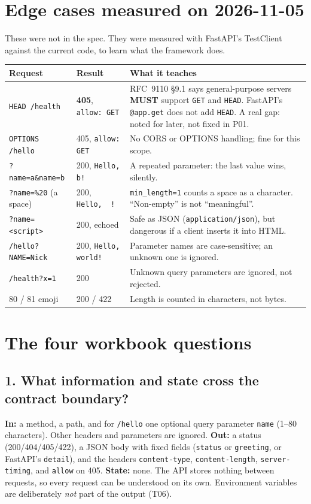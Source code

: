 \documentclass[11pt,a4paper]{article}
\newcommand{\code}[1]{\texttt{#1}}
\begin{document}
\section{Edge cases measured on 2026-11-05}\label{sec:measured}

These were not in the spec. They were measured with FastAPI's TestClient
against the current code, to learn what the framework does.

{\small
\begin{tabularx}{\linewidth}{@{}l l L@{}}
\toprule
\textbf{Request} & \textbf{Result} & \textbf{What it teaches} \\
\midrule
\code{HEAD /health} & \textbf{405}, \code{allow: GET} &
RFC~9110 \S9.1 says general-purpose servers \textbf{MUST} support \code{GET}
and \code{HEAD}. FastAPI's \code{@app.get} does not add \code{HEAD}.
A real gap: noted for later, not fixed in P01. \\
\code{OPTIONS /hello} & 405, \code{allow: GET} & No CORS or OPTIONS handling; fine for this scope. \\
\code{?name=a\&name=b} & 200, \code{Hello, b!} & A repeated parameter: the last value wins, silently. \\
\code{?name=\%20} (a space) & 200, \code{Hello,\ \ !} & \code{min\_length=1} counts a space as a character. ``Non-empty'' is not ``meaningful''. \\
\code{?name=<script>} & 200, echoed & Safe as JSON (\code{application/json}), but dangerous if a client inserts it into HTML. \\
\code{/hello?NAME=Nick} & 200, \code{Hello, world!} & Parameter names are case-sensitive; an unknown one is ignored. \\
\code{/health?x=1} & 200 & Unknown query parameters are ignored, not rejected. \\
80 / 81 emoji & 200 / 422 & Length is counted in characters, not bytes. \\
\bottomrule
\end{tabularx}
}

\section{The four workbook questions}

\subsection*{1. What information and state cross the contract boundary?}
\textbf{In:} a method, a path, and for \code{/hello} one optional query
parameter \code{name} (1--80 characters). Other headers and parameters are
ignored. \textbf{Out:} a status (200/404/405/422), a JSON body with fixed
fields (\code{status} or \code{greeting}, or FastAPI's \code{detail}), and the
headers \code{content-type}, \code{content-length}, \code{server-timing}, and
\code{allow} on 405. \textbf{State:} none. The API stores nothing between
requests, so every request can be understood on its own. Environment
variables are deliberately \emph{not} part of the output (T06).
\end{document}
